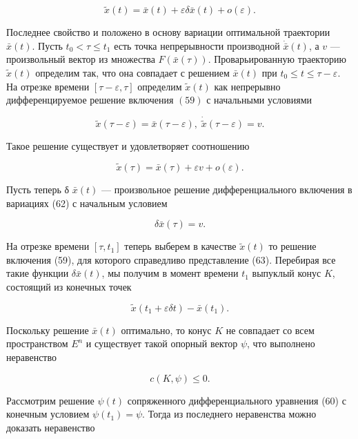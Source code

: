 \documentclass[10pt]{article}
\begin{document}
\[
\widetilde{x}\left( t\right)  = \bar{x}\left( t\right)  + {\varepsilon \delta }\bar{x}\left( t\right)  + o\left( \varepsilon \right). \tag{63}
\]

Последнее свойство и положено в основу вариации оптимальной траектории \(\bar{x}\left( t\right)\). Пусть \({t}_{0} < \tau  \leq  {t}_{1}\) есть точка непрерывности производной \(\dot{\bar{x}}\left( t\right)\), а \(v\) — произвольный вектор из множества \(F\left( {\bar{x}\left( \tau \right) }\right)\). Проварьированную траекторию \(\widetilde{x}\left( t\right)\) определим так, что она совпадает с решением \(\bar{x}\left( t\right)\) при \({t}_{0} \leq  t \leq  \tau  - \varepsilon\). На отрезке времени \(\left\lbrack  {\tau  - \varepsilon,\tau }\right\rbrack\) определим \(\widetilde{x}\left( t\right)\) как непрерывно дифференцируемое решение включения \(\left( {59}\right)\) с начальными условиями

\[
\widetilde{x}\left( {\tau  - \varepsilon }\right)  = \bar{x}\left( {\tau  - \varepsilon }\right),\;\dot{\widetilde{x}}\left( {\tau  - \varepsilon }\right)  = v.
\]

Такое решение существует и удовлетворяет соотношению

\[
\widetilde{x}\left( \tau \right)  = \bar{x}\left( \tau \right)  + {\varepsilon v} + o\left( \varepsilon \right).
\]

Пусть теперь δ \(\bar{x}\left( t\right)\) — произвольное решение дифференциального включения в вариациях (62) с начальным условием

\[
\delta \bar{x}\left( \tau \right)  = v.
\]

На отрезке времени \(\left\lbrack  {\tau,{t}_{1}}\right\rbrack\) теперь выберем в качестве \(\widetilde{x}\left( t\right)\) то решение включения (59), для которого справедливо представление (63). Перебирая все такие функции \(\delta \bar{x}\left( t\right)\), мы получим в момент времени \({t}_{1}\) выпуклый конус \(K\), состоящий из конечных точек

\[
\widetilde{x}\left( {{t}_{1} + {\varepsilon \delta t}}\right)  - \bar{x}\left( {t}_{1}\right).
\]

Поскольку решение \(\bar{x}\left( t\right)\) оптимально, то конус \(K\) не совпадает со всем пространством \({E}^{n}\) и существует такой опорный вектор \(\psi\), что выполнено неравенство

\[
c\left( {K,\psi }\right)  \leq  0.
\]

Рассмотрим решение \(\psi \left( t\right)\) сопряженного дифференциального уравнения (60) с конечным условием \(\psi \left( {t}_{1}\right)  = \psi\). Тогда из последнего неравенства можно доказать неравенство
\end{document}
